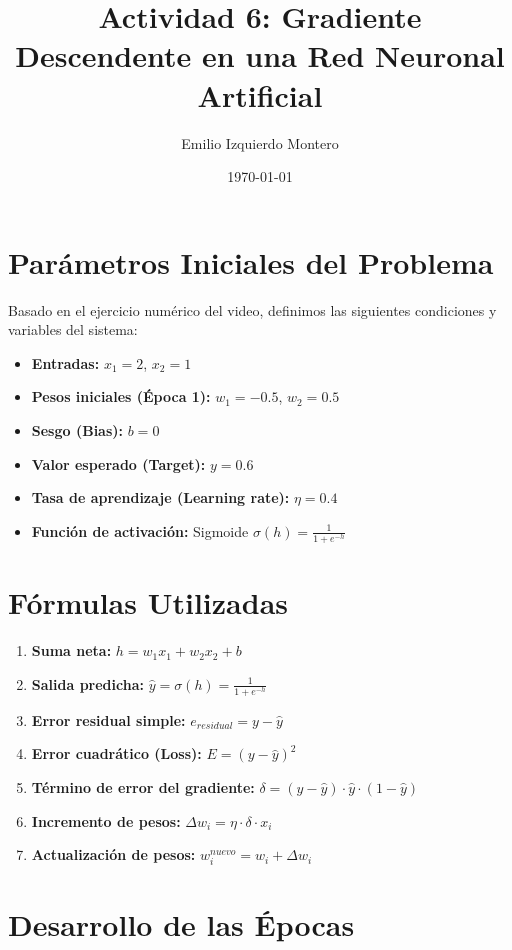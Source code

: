 \documentclass[12pt]{article}
\title{Actividad 6: Gradiente Descendente en una Red Neuronal Artificial}
\author{Emilio Izquierdo Montero}
\date{\today}
\begin{document}
\maketitle

\section{Parámetros Iniciales del Problema}
Basado en el ejercicio numérico del video, definimos las siguientes condiciones y variables del sistema:
\begin{itemize}
    \item \textbf{Entradas:} $x_1 = 2$, $x_2 = 1$
    \item \textbf{Pesos iniciales (Época 1):} $w_1 = -0.5$, $w_2 = 0.5$
    \item \textbf{Sesgo (Bias):} $b = 0$
    \item \textbf{Valor esperado (Target):} $y = 0.6$
    \item \textbf{Tasa de aprendizaje (Learning rate):} $\eta = 0.4$
    \item \textbf{Función de activación:} Sigmoide $\sigma(h) = \frac{1}{1 + e^{-h}}$
\end{itemize}

\section{Fórmulas Utilizadas}
\begin{enumerate}
    \item \textbf{Suma neta:} $h = w_1x_1 + w_2x_2 + b$
    \item \textbf{Salida predicha:} $\hat{y} = \sigma(h) = \frac{1}{1 + e^{-h}}$
    \item \textbf{Error residual simple:} $e_{residual} = y - \hat{y}$
    \item \textbf{Error cuadrático (Loss):} $E = (y - \hat{y})^2$
    \item \textbf{Término de error del gradiente:} $\delta = (y - \hat{y}) \cdot \hat{y} \cdot (1 - \hat{y})$
    \item \textbf{Incremento de pesos:} $\Delta w_i = \eta \cdot \delta \cdot x_i$
    \item \textbf{Actualización de pesos:} $w_i^{nuevo} = w_i + \Delta w_i$
\end{enumerate}

\newpage

\section{Desarrollo de las Épocas}
\end{document}
